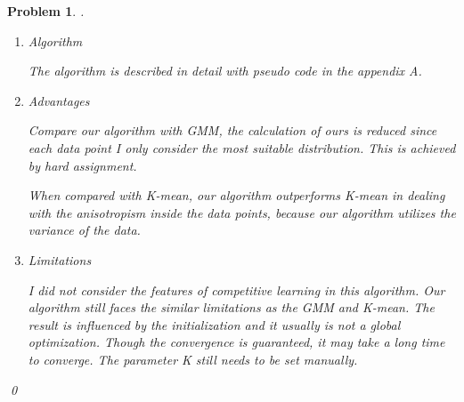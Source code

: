 \documentclass[12pt]{article}
\newtheorem{hw}{Problem}
\newenvironment{sol}
  {\par\vspace{3mm}\noindent{\it Solution}.}
  {\qed}
\begin{document}
\begin{hw}
\begin{sol}
\begin{enumerate}
{		}
		\item[(2)]{
			Algorithm
			
			The algorithm is described in detail with pseudo code in the appendix A.
		}
		\item[(3)]{
			Advantages
			
			Compare our algorithm with GMM, the calculation of ours is reduced since each data point I only consider the most suitable distribution. This is achieved by hard assignment.
			
			When compared with K-mean, our algorithm outperforms K-mean in dealing with the anisotropism inside the data points, because our algorithm utilizes the variance of the data. 
		}
		\item[(4)]{
			Limitations
			
			I did not consider the features of competitive learning in this algorithm. Our algorithm still faces the similar limitations as the GMM and K-mean. The result is influenced by the initialization and it usually is not a global optimization. Though the convergence is guaranteed, it may take a long time to converge. The parameter K still needs to be set manually.
		}
	\end{enumerate}
\end{sol}
\end{hw}
\end{document}
